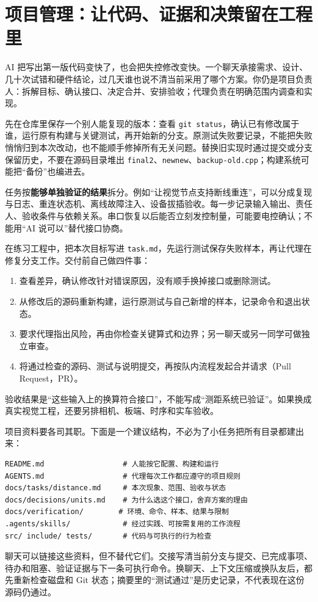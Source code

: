 \section{项目管理：让代码、证据和决策留在工程里}
\label{sec:ai-project-management}

AI 把写出第一版代码变快了，也会把失控修改变快。一个聊天承接需求、设计、几十次试错和硬件结论，过几天谁也说不清当前采用了哪个方案。你仍是项目负责人：拆解目标、确认接口、决定合并、安排验收；代理负责在明确范围内调查和实现。

先在仓库里保存一个别人能复现的版本：查看 \texttt{git status}，确认已有修改属于谁，运行原有构建与关键测试，再开始新的分支。原测试失败要记录，不能把失败悄悄归到本次改动，也不能顺手修掉所有无关问题。替换旧实现时通过提交或分支保留历史，不要在源码目录堆出 \texttt{final2}、\texttt{newnew}、\texttt{backup-old.cpp}；构建系统可能把“备份”也编进去。

任务按\textbf{能够单独验证的结果}拆分。例如“让视觉节点支持断线重连”，可以分成复现与日志、重连状态机、离线故障注入、设备拔插验收。每一步记录输入输出、责任人、验收条件与依赖关系。串口恢复以后能否立刻发控制量，可能要电控确认；不能用“AI 说可以”替代接口协商。

\begin{example}[给一个小任务安排完整闭环]
在练习工程中，把本次目标写进 \texttt{task.md}，先运行测试保存失败样本，再让代理在修复分支工作。交付前自己做四件事：
\begin{enumerate}
  \item 查看差异，确认修改针对错误原因，没有顺手换掉接口或删除测试。
  \item 从修改后的源码重新构建，运行原测试与自己新增的样本，记录命令和退出状态。
  \item 要求代理指出风险，再由你检查关键算式和边界；另一聊天或另一同学可做独立审查。
  \item 将通过检查的源码、测试与说明提交，再按队内流程发起合并请求（Pull Request，PR）。
\end{enumerate}
验收结果是“这些输入上的换算符合接口”，不能写成“测距系统已验证”。如果换成真实视觉工程，还要另排相机、板端、时序和实车验收。
\end{example}

项目资料要各司其职。下面是一个建议结构，不必为了小任务把所有目录都建出来：
\begin{lstlisting}[language={}]
README.md                  # 人能按它配置、构建和运行
AGENTS.md                  # 代理每次工作都应遵守的项目规则
docs/tasks/distance.md     # 本次现象、范围、验收与状态
docs/decisions/units.md    # 为什么选这个接口，舍弃方案的理由
docs/verification/        # 环境、命令、样本、结果与限制
.agents/skills/            # 经过实践、可按需复用的工作流程
src/ include/ tests/       # 代码与可执行的行为检查
\end{lstlisting}
聊天可以链接这些资料，但不替代它们。交接写清当前分支与提交、已完成事项、待办和阻塞、验证证据与下一条可执行命令。换聊天、上下文压缩或换队友后，都先重新检查磁盘和 Git 状态；摘要里的“测试通过”是历史记录，不代表现在这份源码仍通过。

